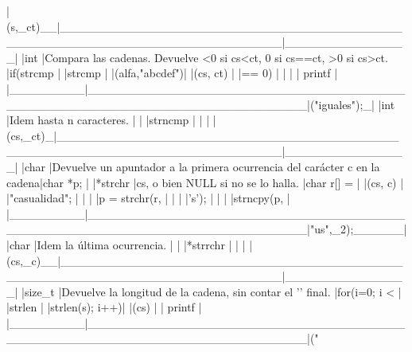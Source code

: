 |(s,_ct)__|__________________________________________________________________________|_______________|
|int      |Compara las cadenas. Devuelve <0 si cs<ct, 0 si cs==ct, >0 si cs>ct.      |if(strcmp      |
|strcmp   |                                                                          |(alfa,"abcdef")|
|(cs, ct) |                                                                          |== 0)          |
|         |                                                                          |    printf     |
|_________|__________________________________________________________________________|("iguales\n");_|
|int      |Idem hasta n caracteres.                                                  |               |
|strncmp  |                                                                          |               |
|(cs,_ct)_|__________________________________________________________________________|_______________|
|char     |Devuelve un apuntador a la primera ocurrencia del carácter c en la cadena|char *p;       |
|*strchr  |cs, o bien NULL si no se lo halla.                                        |char r[] =     |
|(cs, c)  |                                                                          |"casualidad";  |
|         |                                                                          |p = strchr(r,  |
|         |                                                                          |'s');          |
|         |                                                                          |strncpy(p,     |
|_________|__________________________________________________________________________|"us",_2);______|
|char     |Idem la última ocurrencia.                                               |               |
|*strrchr |                                                                          |               |
|(cs,_c)__|__________________________________________________________________________|_______________|
|size_t   |Devuelve la longitud de la cadena, sin contar el '\0' final.              |for(i=0; i <   |
|strlen   |                                                                          |strlen(s); i++)|
|(cs)     |                                                                          |    printf     |
|_________|__________________________________________________________________________|("%

